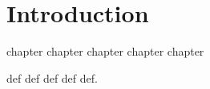 \chapter{Introduction}

chapter chapter chapter
chapter chapter

\begin{definition}
  def def  def
  def def.
\end{definition}

